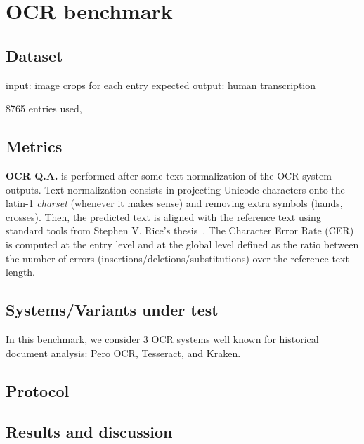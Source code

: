 \section{OCR benchmark}
\label{sec:ocr-xp}

\subsection{Dataset}
input: image crops for each entry
expected output: human transcription

8765 entries used, 

\subsection{Metrics}
\textbf{OCR Q.A.} is performed after some text normalization of the OCR system outputs. Text normalization consists in
projecting Unicode characters onto the latin-1 \emph{charset} (whenever it makes sense) and removing extra symbols
(hands, crosses). Then, the predicted text is aligned with the reference text using standard tools from Stephen V.
Rice's thesis~\cite{santos.2019.wcmel,neudecker.2021.whdip}. The Character Error Rate (CER) is computed at the entry
level and at the global level defined as the ratio between the number of errors (insertions/deletions/substitutions)
over the reference text length. 

\subsection{Systems/Variants under test}
In this benchmark, we consider 3 OCR systems well known for historical document analysis: Pero OCR, Tesseract, and Kraken. 

\subsection{Protocol}

\subsection{Results and discussion}

